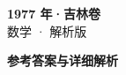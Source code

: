 \documentclass[zihao=-4, a4paper]{ctexart}
\begin{document}
\begin{center}
  {\Large\bfseries 1977 年·吉林卷}\\[4pt]
  {\large 数学 · 解析版}
\end{center}
\medskip
{}

\clearpage
{}
\begin{center}{\Large\bfseries 参考答案与详细解析}\end{center}
\medskip

\end{document}
